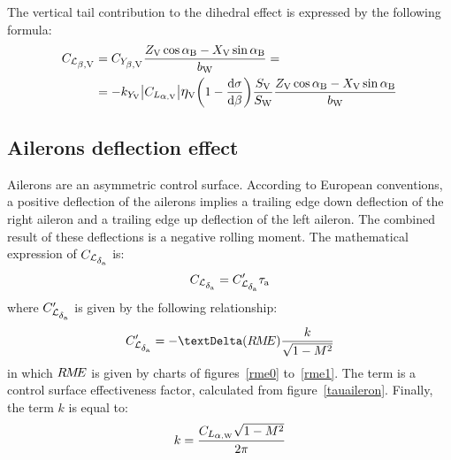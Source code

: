 The vertical tail contribution to the dihedral effect is expressed by the following formula:
\begin{equation}
\label{eq:dihedralV}
\begin{split}
\CLbetaV & = \CYbetaV \frac{\ZV \cos\alphaB - \XV\sin\alphaB}{\bW} = \\
& = - k_{Y_\mathrm V} \big|\CLalphaV \big| \etaV \biggl( 1 - \frac{\mathrm{d}\sigma}{\mathrm{d}\beta} \biggr) \frac{\SV}{\SW} \frac{\ZV \cos\alphaB - \XV\sin\alphaB}{\bW}
\end{split}
\end{equation}

\subsection{Ailerons deflection effect}
\label{subsec2.2.2}

Ailerons are an asymmetric control surface. According to European conventions, a positive deflection of the ailerons implies a trailing edge down deflection of the right aileron and a trailing edge up deflection of the left aileron. The combined result of these deflections is a negative rolling moment. The mathematical expression of $\CLdeltaa$ is:
\begin{equation}
\label{eq:ailRoll}
\CLdeltaa = \CLdeltaa' \tauail
\end{equation}
where $\CLdeltaa'$ is given by the following relationship:
\begin{equation}
\CLdeltaa' = - \textrm \textDelta (R\hspace{-0.1em} M \hspace{-0.2em} E) \frac{k}{\sqrt{1 - M^2}}
\end{equation}
in which $R \hspace{-0.1em} M \hspace{-0.2em} E$ is given by charts of figures~\vref{rme0} to~\vref{rme1}. The term \tauail is a control surface effectiveness factor, calculated from figure~\vref{tauaileron}. Finally, the term $k$ is equal to: %
\begin{equation}
k = \frac{\CLalphaW \sqrt{1 - M^2}}{2\pi}
\end{equation}

